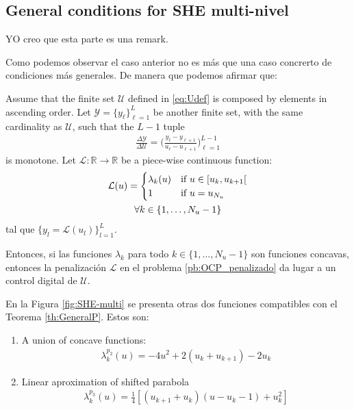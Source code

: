 \documentclass[twocolumn]{autart}    %
\begin{document}
{\color{red}
\subsection{General conditions for  SHE multi-nivel}   

YO creo que esta parte es una remark.

Como podemos observar el caso anterior no es más que una caso concrerto de condiciones más generales. De manera que podemos afirmar que: 
\vspace{1em}
\begin{theorem}\label{th:GeneralP}
    Assume that the finite set $\mathcal{U}$ defined in \eqref{eq:Udef} is composed by elements in ascending order. Let $\mathcal{Y} = \{y_\ell\}_{\ell=1}^L$ be another finite set, with the same cardinality as $\mathcal U$, such that the $L-1$ tuple
    \begin{gather}
        \frac{\Delta \mathcal{Y}}{\Delta \mathcal{U}} = \Bigg( \frac{y_\ell - y_{\ell+1}}{u_\ell - u_{\ell+1}} \Bigg)_{\ell=1}^{L-1}
    \end{gather}  is monotone. Let $\mathcal{L}:\mathbb{R} \rightarrow \mathbb{R}$ be a piece-wise continuous function:
    \begin{gather}
        \mathcal{L}(u) = \begin{cases}
            \lambda_k(u) & \text{if }  u \in [u_k,u_{k+1}[ \\
            1 & \text{if } u = u_{N_u} 
        \end{cases} \\
        \notag \forall k \in \{1,\dots,N_u-1\}
    \end{gather}    
    tal que $\{y_l = \mathcal{L}(u_l)\}_{l=1}^L$. 
    
    Entonces, si las funciones $\lambda_k$ para todo $k \in  \{1,\dots,N_u-1\}$  son funciones concavas, entonces la penalización $\mathcal{L}$ en el problema \ref{pb:OCP_penalizado} da lugar a un control digital de $\mathcal{U}$.
\end{theorem}

En la Figura \ref{fig:SHE-multi} se presenta otras dos funciones  compatibles con el Teorema \ref{th:GeneralP}. Estos son:

\begin{enumerate}
    \item A union of concave functions:
    \begin{gather}
        \lambda_k^{p_2}(u) = -4u^2 + 2(u_k + u_{k+1}) - 2u_{k}
    \end{gather}
    \item Linear aproximation of shifted parabola
    \begin{gather}
        \lambda_k^{p_3}(u) = \frac 1 4[(u_{k+1}+u_{k}) (u-u_k-1) + u_k^2]
    \end{gather}
\end{enumerate}

}
\end{document}
